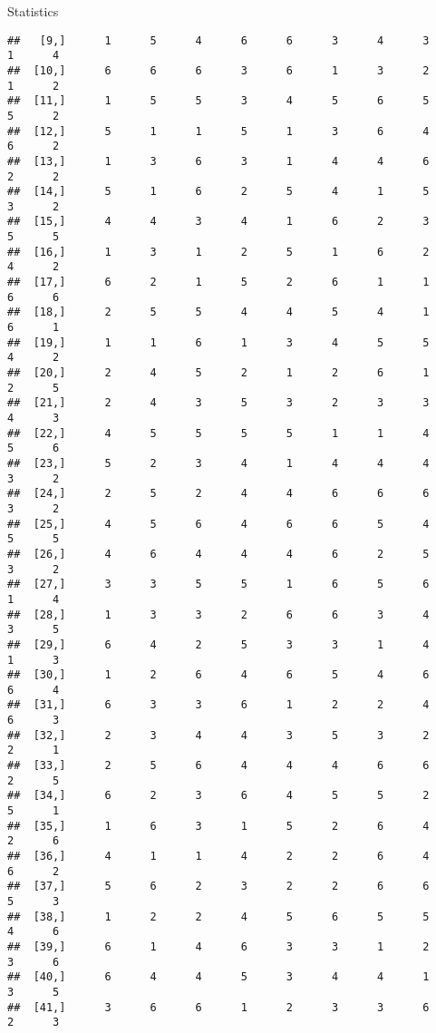 \documentclass[
  ignorenonframetext,
]{beamer}
\begin{document}
\begin{frame}[fragile]{Statistics}
\begin{verbatim}
##   [9,]      1      5      4      6      6      3      4      3      1      4
##  [10,]      6      6      6      3      6      1      3      2      1      2
##  [11,]      1      5      5      3      4      5      6      5      5      2
##  [12,]      5      1      1      5      1      3      6      4      6      2
##  [13,]      1      3      6      3      1      4      4      6      2      2
##  [14,]      5      1      6      2      5      4      1      5      3      2
##  [15,]      4      4      3      4      1      6      2      3      5      5
##  [16,]      1      3      1      2      5      1      6      2      4      2
##  [17,]      6      2      1      5      2      6      1      1      6      6
##  [18,]      2      5      5      4      4      5      4      1      6      1
##  [19,]      1      1      6      1      3      4      5      5      4      2
##  [20,]      2      4      5      2      1      2      6      1      2      5
##  [21,]      2      4      3      5      3      2      3      3      4      3
##  [22,]      4      5      5      5      5      1      1      4      5      6
##  [23,]      5      2      3      4      1      4      4      4      3      2
##  [24,]      2      5      2      4      4      6      6      6      3      2
##  [25,]      4      5      6      4      6      6      5      4      5      5
##  [26,]      4      6      4      4      4      6      2      5      3      2
##  [27,]      3      3      5      5      1      6      5      6      1      4
##  [28,]      1      3      3      2      6      6      3      4      3      5
##  [29,]      6      4      2      5      3      3      1      4      1      3
##  [30,]      1      2      6      4      6      5      4      6      6      4
##  [31,]      6      3      3      6      1      2      2      4      6      3
##  [32,]      2      3      4      4      3      5      3      2      2      1
##  [33,]      2      5      6      4      4      4      6      6      2      5
##  [34,]      6      2      3      6      4      5      5      2      5      1
##  [35,]      1      6      3      1      5      2      6      4      2      6
##  [36,]      4      1      1      4      2      2      6      4      6      2
##  [37,]      5      6      2      3      2      2      6      6      5      3
##  [38,]      1      2      2      4      5      6      5      5      4      6
##  [39,]      6      1      4      6      3      3      1      2      3      6
##  [40,]      6      4      4      5      3      4      4      1      3      5
##  [41,]      3      6      6      1      2      3      3      6      2      3

\end{verbatim}
\end{frame}
\end{document}
